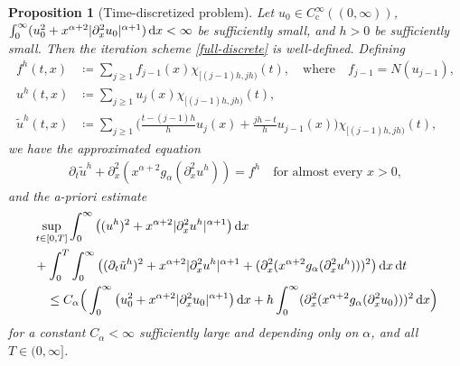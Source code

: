\documentclass[reqno,12pt]{amsart}
\renewcommand{\d}{\ensuremath{\mathrm{d}}}
\renewcommand{\d}{\ensuremath{{\rm d}}}
\newtheorem{proposition}[theorem]{Proposition}
\numberwithin{equation}{section}
\begin{document}
%
\begin{proposition}[Time-discretized problem]\label{prop-discrete-est}
Let $u_0 \in C^\infty_\mathrm{c}((0,\infty))$, $\int_0^\infty (u_0^2 + x^{\alpha+2} |\partial_x^2 u_0|^{\alpha+1}) \, \d x < \infty$ be sufficiently small, and $h > 0$ be sufficiently small. Then the iteration scheme \eqref{full-discrete} is well-defined. Defining
%
\begin{align*}
f^h(t,x) &\coloneq \sum_{j \ge 1} f_{j-1}(x) \chi_{[(j-1)h,jh)}(t), \quad \text{where} \quad f_{j-1} = N(u_{j-1}), \\
u^h(t,x) &\coloneq \sum_{j \ge 1} u_j(x) \chi_{[(j-1)h,jh)}(t), \\
\tilde u^h(t,x) &\coloneq \sum_{j \ge 1} \big(\tfrac{t-(j-1)h}{h} u_j(x) + \tfrac{jh-t}{h} u_{j-1}(x)\big) \chi_{[(j-1)h,jh)}(t),
\end{align*}
%
we have the approximated equation
%
\begin{align}\label{eq-uh}
\partial_t \tilde u^h + \partial_x^2 (x^{\alpha+2} g_\alpha(\partial_x^2 u^h)) = f^h \quad \text{for almost every } x > 0,
\end{align}
%
and the a-priori estimate
%
\begin{align}\nonumber
& \sup_{t \in [0,T]} \int_0^\infty \big((u^h)^2 + x^{\alpha+2} |\partial_x^2 u^h|^{\alpha+1}\big) \, \d x \\
&+ \int_0^T \int_0^\infty \big((\partial_t \tilde u^h)^2 + x^{\alpha+2} |\partial_x^2 u^h|^{\alpha+1} + (\partial_x^2 (x^{\alpha+2} g_\alpha(\partial_x^2 u^h)))^2\big) \, \d x \, \d t \nonumber\\
& \quad \le C_\alpha \Big(\int_0^\infty \big(u_0^2 + x^{\alpha+2} |\partial_x^2 u_0|^{\alpha+1}\big) \, \d x + h \int_0^\infty (\partial_x^2 (x^{\alpha+2} g_\alpha(\partial_x^2 u_0)))^2 \, \d x\Big) \label{apriori-uh-nonlinear}
\end{align}
%
for a constant $C_\alpha < \infty$ sufficiently large and depending only on $\alpha$, and all $T \in (0,\infty]$. 
\end{proposition}
%
\end{document}
